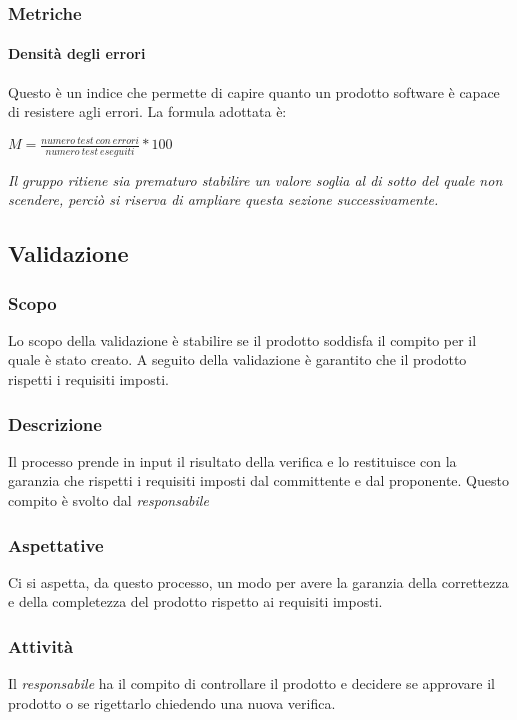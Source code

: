 \documentclass[../norme_di_progetto.tex]{subfiles}
\begin{document}
\subsubsection{Metriche}
\paragraph{Densità degli errori}
Questo è un indice che permette di capire quanto un prodotto software è capace di resistere agli errori. La formula adottata è:
\begin{center}
    \textbf{$M = \frac{numero\ test\ con\ errori}{numero\ test\ eseguiti} * 100$}
\end{center}
\emph{Il gruppo ritiene sia prematuro stabilire un valore soglia al di sotto del quale non scendere, perciò si riserva di ampliare questa sezione successivamente.}

\subsection{Validazione}

\subsubsection{Scopo}
Lo scopo della validazione è stabilire se il prodotto soddisfa il compito per il quale è stato creato. A seguito della validazione è garantito che il prodotto rispetti i requisiti imposti.

\subsubsection{Descrizione}
Il processo prende in input il risultato della verifica e lo restituisce con la garanzia che rispetti i requisiti imposti dal committente e dal proponente. Questo compito è svolto dal \emph{responsabile}

\subsubsection{Aspettative}
Ci si aspetta, da questo processo, un modo per avere la garanzia della correttezza e della completezza del prodotto rispetto ai requisiti imposti.

\subsubsection{Attività}
Il \emph{responsabile} ha il compito di controllare il prodotto e decidere se approvare il prodotto o se rigettarlo chiedendo una nuova verifica.
\end{document}
